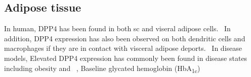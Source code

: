 \subsection{Adipose tissue}
In human, DPP4 has been found in both sc and viseral adipose cells.~\cite{Lamers2011} In addition, DPP4 expression has also been observed on both dendritic cells and macrophages if they are in contact with visceral adipose deports.~\cite{Zhong2013} In disease models, Elevated DPP4 expression has commonly been found in disease states including obesity and ~\cite{Zhong2013},  Baseline glycated hemoglobin (HbA\textsubscript{1c}) 